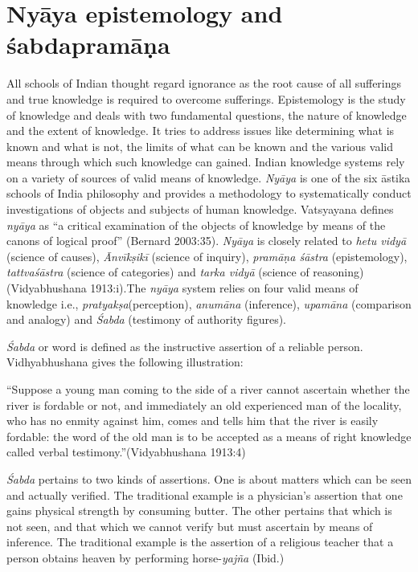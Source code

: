 \section*{Nyāya epistemology and śabdapramāṇa}

All schools of Indian thought regard ignorance as the root cause of all sufferings and true knowledge is required to overcome sufferings. Epistemology is the study of knowledge and deals with two fundamental questions, the nature of knowledge and the extent of knowledge. It tries to address issues like determining what is known and what is not, the limits of what can be known and the various valid means through which such knowledge can gained. Indian knowledge systems rely on a variety of sources of valid means of knowledge. \textit{Nyāya} is one of the six āstika schools of India philosophy and provides a methodology to systematically conduct investigations of objects and subjects of human knowledge. Vatsyayana defines \textit{nyāya} as “a critical examination of the objects of knowledge by means of the canons of logical proof” (Bernard 2003:35). \textit{Nyāya} is closely related to \textit{hetu vidyā} (science of causes), \textit{Ānvīkṣikī} (science of inquiry), \textit{pramāṇa śāstra} (epistemology), \textit{tattvaśāstra} (science of categories) and \textit{tarka vidyā} (science of reasoning) (Vidyabhushana 1913:i).The \textit{nyāya} system relies on four valid means of knowledge i.e., \textit{pratyakṣa}(perception), \textit{anumāna} (inference), \textit{upamāna} (comparison and analogy) and \textit{Śabda} (testimony of authority figures).

\newpage

\textit{Śabda} or word is defined as the instructive assertion of a reliable person. Vidhyabhushana gives the following illustration:

\begin{myquote}
“Suppose a young man coming to the side of a river cannot ascertain whether the river is fordable or not, and immediately an old experienced man of the locality, who has no enmity against him, comes and tells him that the river is easily fordable: the word of the old man is to be accepted as a means of right knowledge called verbal testimony.”(Vidyabhushana 1913:4)
\end{myquote}

\textit{Śabda} pertains to two kinds of assertions. One is about matters which can be seen and actually verified. The traditional example is a physician’s assertion that one gains physical strength by consuming butter. The other pertains that which is not seen, and that which we cannot verify but must ascertain by means of inference. The traditional example is the assertion of a religious teacher that a person obtains heaven by performing horse-\textit{yajña} (Ibid.)

